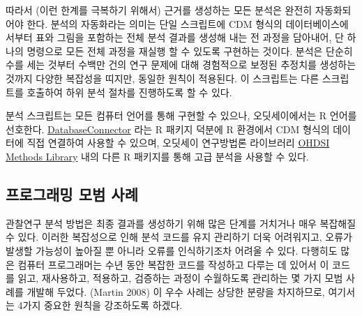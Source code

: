 \documentclass[10.5pt]{book}
\theoremstyle{definition}
\theoremstyle{definition}
\theoremstyle{definition}
\theoremstyle{remark}
\begin{document}
따라서 (이런 한계를 극복하기 위해서) 근거를 생성하는 모든 분석은 완전히
자동화되어야 한다. 분석의 자동화라는 의미는 단일 스크립트에 CDM 형식의
데이터베이스에서부터 표와 그림을 포함하는 전체 분석 결과를 생성해 내는
전 과정을 담아내어, 단 하나의 명령으로 모든 전체 과정을 재실행 할 수
있도록 구현하는 것이다. 분석은 단순히 수를 세는 것부터 수백만 건의 연구
문제에 대해 경험적으로 보정된 추정치를 생성하는 것까지 다양한 복잡성을
띠지만, 동일한 원칙이 적용된다. 이 스크립트는 다른 스크립트를 호출하여
하위 분석 절차를 진행하도록 할 수 있다.

분석 스크립트는 모든 컴퓨터 언어를 통해 구현할 수 있으나, 오딧세이에서는
R 언어를 선호한다.
\href{https://ohdsi.github.io/DatabaseConnector/}{DatabaseConnector}
라는 R 패키지 덕분에 R 환경에서 CDM 형식의 데이터에 직접 연결하여 사용할
수 있으며, 오딧세이 연구방법론 라이브러리
\href{https://ohdsi.github.io/MethodsLibrary/}{OHDSI Methods Library}
내의 다른 R 패키지를 통해 고급 분석을 사용할 수 있다.

\subsection{프로그래밍 모범 사례}\label{--}

관찰연구 분석 방법은 최종 결과를 생성하기 위해 많은 단계를 거치거나 매우
복잡해질 수 있다. 이러한 복잡성으로 인해 분석 코드를 유지 관리하기 더욱
어려워지고, 오류가 발생할 가능성이 높아질 뿐 아니라 오류를 인식하기조차
어려울 수 있다. 다행히도 많은 컴퓨터 프로그래머는 수년 동안 복잡한
코드를 작성하고 다루는 데 있어서 이 코드를 읽고, 재사용하고, 적용하고,
검증하는 과정이 수월하도록 관리하는 몇 가지 모범 사례를 개발해 두었다.
(Martin 2008) 이 우수 사례는 상당한 분량을 차지하므로, 여기서는 4가지
중요한 원칙을 강조하도록 하겠다. 
\end{document}
